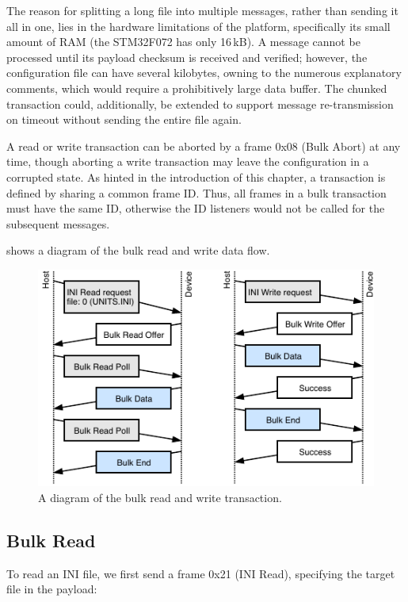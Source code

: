 The reason for splitting a long file into multiple messages, rather than sending it all in one, lies in the hardware limitations of the platform, specifically its small amount of \gls{RAM} (the STM32F072 has only 16\,kB). A message cannot be processed until its payload checksum is received and verified; however, the configuration file can have several kilobytes, owning to the numerous explanatory comments, which would require a prohibitively large data buffer. The chunked transaction could, additionally, be extended to support message re-transmission on timeout without sending the entire file again.

A read or write transaction can be aborted by a frame 0x08 (Bulk Abort) at any time, though aborting a write transaction may leave the configuration in a corrupted state. As hinted in the introduction of this chapter, a transaction is defined by sharing a common frame ID. Thus, all frames in a bulk transaction must have the same ID, otherwise the ID listeners would not be called for the subsequent messages.

 shows a diagram of the bulk read and write data flow.

\begin{figure}
	\centering
	\includegraphics[scale=1.5]{img/bulk-read-write.pdf}
	\caption{\label{fig:bulk-rw}A diagram of the bulk read and write transaction.}
\end{figure}

\subsection{Bulk Read}

To read an INI file, we first send a frame 0x21 (INI Read), specifying the target file in the payload:

